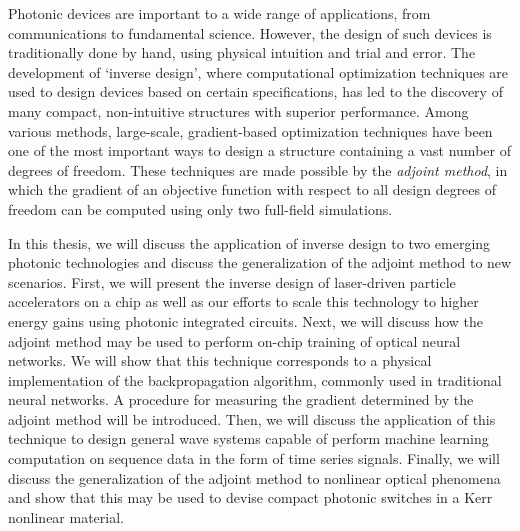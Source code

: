 Photonic devices are important to a wide range of applications, from communications to fundamental science.  However, the design of such devices is traditionally done by hand, using physical intuition and trial and error.  The development of ‘inverse design’, where computational optimization techniques are used to design devices based on certain specifications, has led to the discovery of many compact, non-intuitive structures with superior performance. Among various methods, large-scale, gradient-based optimization techniques have been one of the most important ways to design a structure containing a vast number of degrees of freedom. These techniques are made possible by the \textit{adjoint method}, in which the gradient of an objective function with respect to all design degrees of freedom can be computed using only two full-field simulations.

In this thesis, we will discuss the application of inverse design to two emerging photonic technologies and discuss the generalization of the adjoint method to new scenarios.   First, we will present the inverse design of laser-driven particle accelerators on a chip as well as our efforts to scale this technology to higher energy gains using photonic integrated circuits.  Next, we will discuss how the adjoint method may be used to perform on-chip training of optical neural networks.  We will show that this technique corresponds to a physical implementation of the backpropagation algorithm, commonly used in traditional neural networks.  A procedure for measuring the gradient determined by the adjoint method will be introduced.  Then, we will discuss the application of this technique to design general wave systems capable of perform machine learning computation on sequence data in the form of time series signals.  Finally, we will discuss the generalization of the adjoint method to nonlinear optical phenomena and show that this may be used to devise compact photonic switches in a Kerr nonlinear material.
